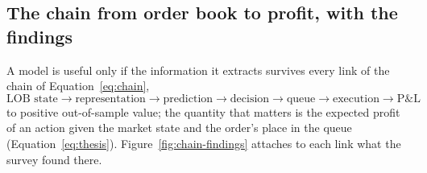 \subsection{The chain from order book to profit, with the findings}
\label{sec:chain-findings}

A model is useful only if the information it extracts survives every link of the chain of
Equation~\eqref{eq:chain},
\[
  \text{LOB state} \to \text{representation} \to \text{prediction} \to \text{decision} \to
  \text{queue} \to \text{execution} \to \text{P\&L}
\]
to positive out-of-sample value; the quantity that matters is the expected profit of an action given the market state
and the order's place in the queue (Equation~\eqref{eq:thesis}).
Figure~\ref{fig:chain-findings} attaches to each link what the survey found there.

